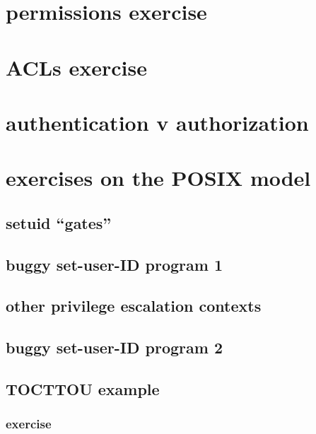 \section{permissions exercise}


\section{ACLs exercise}


\section{authentication v authorization}


\section{exercises on the POSIX model}


\subsection{setuid ``gates''}


\subsection{buggy set-user-ID program 1}


\subsection{other privilege escalation contexts}


\subsection{buggy set-user-ID program 2}


\subsection{TOCTTOU example}




\subsubsection{exercise}

